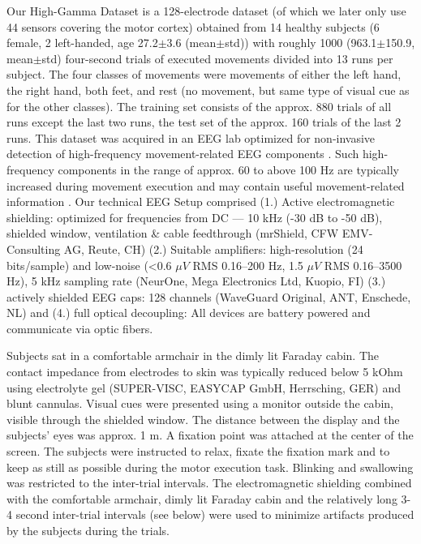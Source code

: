     Our High-Gamma Dataset is a 128-electrode dataset (of which we later
only use 44 sensors covering the motor cortex) obtained from 14 healthy
subjects (6 female, 2 left-handed, age
27.2$\pm$3.6 (mean$\pm$std)) with roughly 1000 (963.1$\pm$150.9, mean$\pm$std)
four-second trials of executed movements divided into 13 runs per
subject. The four classes of movements were movements of either the left
hand, the right hand, both feet, and rest (no movement, but same type of
visual cue as for the other classes). The training set consists of the
approx. 880 trials of all runs except the last two runs, the test set of
the approx. 160 trials of the last 2 runs. This dataset was acquired in
an EEG lab optimized for non-invasive detection of high-frequency
movement-related EEG components
\citep{ball_movement_2008,darvas_high_2010}. Such
high-frequency components in the range of approx. 60 to above 100 Hz are
typically increased during movement execution and may contain useful
movement-related information
\citep{crone_functional_1998,hammer_predominance_2016,quandt_single_2012}.
Our technical EEG Setup comprised (1.) Active electromagnetic shielding:
optimized for frequencies from DC --- 10 kHz (-30 dB to -50 dB), shielded
window, ventilation \& cable feedthrough (mrShield, CFW EMV-Consulting
AG, Reute, CH) (2.) Suitable amplifiers: high-resolution (24
bits/sample) and low-noise (\textless{}0.6 $\mu V$ RMS 0.16--200 Hz,
1.5 $\mu V$ RMS 0.16--3500 Hz), 5 kHz sampling rate (NeurOne, Mega
Electronics Ltd, Kuopio, FI) (3.) actively shielded EEG caps: 128
channels (WaveGuard Original, ANT, Enschede, NL) and (4.) full optical
decoupling: All devices are battery powered and communicate via optic
fibers.

Subjects sat in a comfortable armchair in the dimly lit Faraday cabin.
The contact impedance from electrodes to skin was typically reduced
below 5 kOhm using electrolyte gel (SUPER-VISC, EASYCAP GmbH,
Herrsching, GER) and blunt cannulas. Visual cues were presented using a
monitor outside the cabin, visible through the shielded window. The
distance between the display and the subjects' eyes was approx. 1 m. A
fixation point was attached at the center of the screen. The subjects
were instructed to relax, fixate the fixation mark and to keep as still
as possible during the motor execution task. Blinking and swallowing was
restricted to the inter-trial intervals. The electromagnetic shielding
combined with the comfortable armchair, dimly lit Faraday cabin and the
relatively long 3-4 second inter-trial intervals (see below) were used
to minimize artifacts produced by the subjects during the trials.

